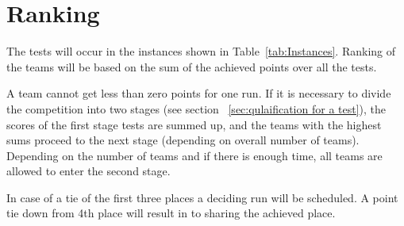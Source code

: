 \section{Ranking}
The tests will occur in the instances shown in Table~\ref{tab:Instances}. Ranking of the teams will be based on the sum of the achieved points over all the tests.

A team cannot get less than zero points for one run. If it is necessary to divide the competition into two stages (see section ~\ref{sec:qulaification for a test}), the scores of the first stage tests are summed up, and the teams with the highest sums proceed to the next stage (depending on overall number of teams). Depending on the number of teams and if there is enough time, all teams are allowed to enter the second stage.

In case of a tie of the first three places a deciding run will be scheduled. A point tie down from 4th place will result in to sharing the achieved place. 


%
%
%


